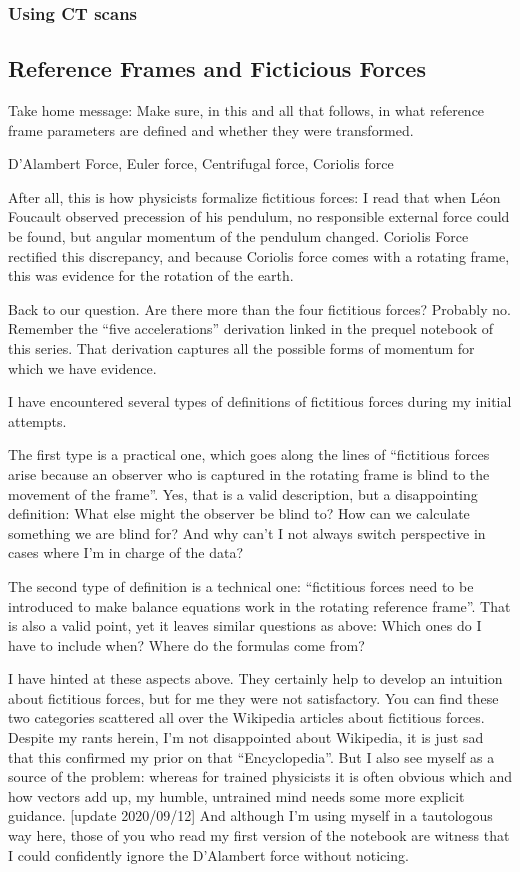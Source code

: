 \subsubsection{Using CT scans}
\label{sec:org1a78e3f}
\citep{DuPlessis2013,Durston2022}

\subsection{Reference Frames and Ficticious Forces}
\label{sec:orge4c93d5}
Take home message: Make sure, in this and all that follows, in what reference frame parameters are defined and whether they were transformed.

D’Alambert Force, Euler force, Centrifugal force, Coriolis force

After all, this is how physicists formalize fictitious forces: I read that when Léon Foucault observed precession of his pendulum, no responsible external force could be found, but angular momentum of the pendulum changed. Coriolis Force rectified this discrepancy, and because Coriolis force comes with a rotating frame, this was evidence for the rotation of the earth.

Back to our question. Are there more than the four fictitious forces? Probably no. Remember the “five accelerations” derivation linked in the prequel notebook of this series. That derivation captures all the possible forms of momentum for which we have evidence.


I have encountered several types of definitions of fictitious forces during my initial attempts.

The first type is a practical one, which goes along the lines of “fictitious forces arise because an observer who is captured in the rotating frame is blind to the movement of the frame”. Yes, that is a valid description, but a disappointing definition: What else might the observer be blind to? How can we calculate something we are blind for? And why can’t I not always switch perspective in cases where I’m in charge of the data?

The second type of definition is a technical one: “fictitious forces need to be introduced to make balance equations work in the rotating reference frame”. That is also a valid point, yet it leaves similar questions as above: Which ones do I have to include when? Where do the formulas come from?

I have hinted at these aspects above. They certainly help to develop an intuition about fictitious forces, but for me they were not satisfactory. You can find these two categories scattered all over the Wikipedia articles about fictitious forces. Despite my rants herein, I’m not disappointed about Wikipedia, it is just sad that this confirmed my prior on that “Encyclopedia”. But I also see myself as a source of the problem: whereas for trained physicists it is often obvious which and how vectors add up, my humble, untrained mind needs some more explicit guidance. [update 2020/09/12] And although I’m using myself in a tautologous way here, those of you who read my first version of the notebook are witness that I could confidently ignore the D’Alambert force without noticing.

